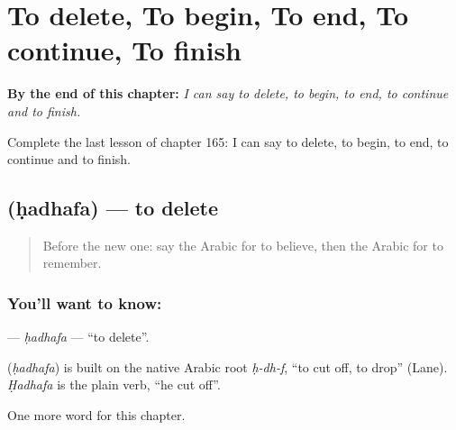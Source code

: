 
\chapter{To delete, To begin, To end, To continue, To finish}
\label{ch:ar-to-delete-to-begin-to-end-to-continue-to-finish}

\begin{chapteropening}
\textbf{By the end of this chapter:} \emph{I can say to delete, to begin, to end, to continue and to finish.}

Complete the last lesson of chapter 165: I can say to delete, to begin, to end, to continue and to finish.
\end{chapteropening}

\section[\texorpdfstring{\ar{حذف} (ḥadhafa)}{حذف (ḥadhafa)}]{ (ḥadhafa) — to delete}

\label{lesson:AR-C165-hadhafa}



\begin{quote}
Before the new one: say the Arabic for to believe, then the Arabic for to remember.
\end{quote}

\subsection*{You'll want to know: }
\textbf{} — \emph{ḥadhafa} — \textquotedblleft{}to delete\textquotedblright{}.

\begin{cousinweb}
\textbf{} (\emph{ḥadhafa}) is built on the native Arabic root \emph{ḥ-dh-f}, \textquotedblleft{}to cut off, to drop\textquotedblright{} (Lane). \emph{Ḥadhafa} is the plain verb, \textquotedblleft{}he cut off\textquotedblright{}.
\end{cousinweb}

\begin{grammarlens}[title={What you've built}]
One more word for this chapter.
\end{grammarlens}

